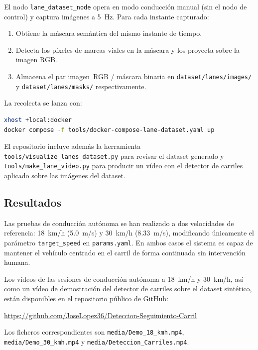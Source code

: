 \documentclass[12pt, a4paper]{article}
\begin{document}
El nodo \texttt{lane\_dataset\_node} opera en modo conducción manual (sin el nodo de control) y captura imágenes a 5~Hz. Para cada instante capturado:
\begin{enumerate}
    \item Obtiene la máscara semántica del mismo instante de tiempo.
    \item Detecta los píxeles de marcas viales en la máscara y los proyecta sobre la imagen RGB.
    \item Almacena el par imagen~RGB / máscara binaria en \texttt{dataset/lanes/images/} y \texttt{dataset/lanes/masks/} respectivamente.
\end{enumerate}

La recolecta se lanza con:
\vspace{0.3cm}
\begin{lstlisting}[language=bash]
xhost +local:docker
docker compose -f tools/docker-compose-lane-dataset.yaml up
\end{lstlisting}

El repositorio incluye además la herramienta \texttt{tools/visualize\_lanes\_dataset.py} para revisar el dataset generado y \texttt{tools/make\_lane\_video.py} para producir un vídeo con el detector de carriles aplicado sobre las imágenes del dataset.

\subsection{Resultados}

Las pruebas de conducción autónoma se han realizado a dos velocidades de referencia: 18~km/h (5.0~m/s) y 30~km/h (8.33~m/s), modificando únicamente el parámetro \texttt{target\_speed} en \texttt{params.yaml}. En ambos casos el sistema es capaz de mantener el vehículo centrado en el carril de forma continuada sin intervención humana.

Los vídeos de las sesiones de conducción autónoma a 18~km/h y 30~km/h, así como un vídeo de demostración del detector de carriles sobre el dataset sintético, están disponibles en el repositorio público de GitHub:

\begin{center}
    \url{https://github.com/JoseLopez36/Deteccion-Seguimiento-Carril}
\end{center}

Los ficheros correspondientes son \texttt{media/Demo\_18\_kmh.mp4}, \texttt{media/Demo\_30\_kmh.mp4} y \texttt{media/Deteccion\_Carriles.mp4}.
\end{document}
